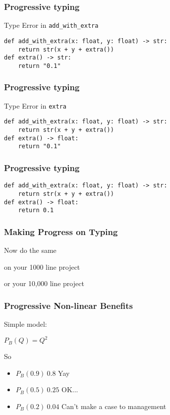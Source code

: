 \begin{frame}[fragile]
\frametitle{Progressive typing}
Type Error in \verb|add_with_extra|
\begin{lstlisting}
def add_with_extra(x: float, y: float) -> str:
    return str(x + y + extra())
def extra() -> str:
    return "0.1"
\end{lstlisting}
\end{frame}

\begin{frame}[fragile]
\frametitle{Progressive typing}
Type Error in \verb|extra|
\begin{lstlisting}
def add_with_extra(x: float, y: float) -> str:
    return str(x + y + extra())
def extra() -> float:
    return "0.1"
\end{lstlisting}
\end{frame}

\begin{frame}[fragile]
\frametitle{Progressive typing}
\begin{lstlisting}
def add_with_extra(x: float, y: float) -> str:
    return str(x + y + extra())
def extra() -> float:
    return 0.1
\end{lstlisting}
\end{frame}

\begin{frame}[fragile]
\frametitle{Making Progress on Typing}

Now do the same\pause

on your 1000 line project\pause

or your 10,000 line project
\end{frame}

\begin{frame}[fragile]
\frametitle{Progressive Non-linear Benefits}

Simple model:

$P_B(Q) = Q^2$

So

\begin{itemize}

\item $P_B(0.9) ~ 0.8$ Yay \pause
\item $P_B(0.5) ~ 0.25$ OK... \pause
\item $P_B(0.2) ~ 0.04$ Can't make a case to management

\end{itemize}

\end{frame}

